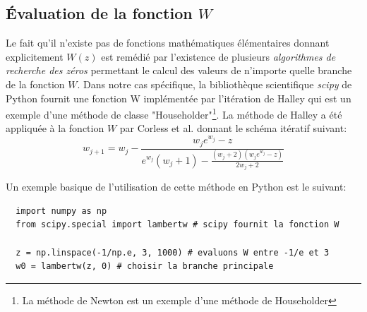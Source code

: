 \subsection{Évaluation de la fonction $W$}

Le fait qu'il n'existe pas de fonctions mathématiques élémentaires donnant explicitement $W(z)$ est remédié par l'existence de plusieurs \textit{algorithmes de recherche des zéros} permettant le calcul des valeurs de n'importe quelle branche de la fonction $W$. Dans notre cas spécifique, la bibliothèque scientifique \textit{scipy} de Python fournit une fonction W implémentée par l'itération de Halley qui est un exemple d'une méthode de classe "Householder"\footnote{La méthode de Newton est un exemple d'une méthode de Householder}. La méthode de Halley a été appliquée à la fonction $W$  par Corless et al. \cite{Corless1996} donnant le schéma itératif suivant:
\begin{equation}
  \label{eq:halley}
  w_{j+1} = w_j - \frac{w_j e^{w_j} - z}{e^{w_j}(w_j + 1) - \frac{(w_j + 2)(w_j e^{w_j} - z)}{2w_j + 2}}
\end{equation}

Un exemple basique de l'utilisation de cette méthode en Python est le suivant:\\

\noindent
\begin{minipage}{\linewidth}
\begin{verbatim}
  import numpy as np 
  from scipy.special import lambertw # scipy fournit la fonction W

  z = np.linspace(-1/np.e, 3, 1000) # evaluons W entre -1/e et 3
  w0 = lambertw(z, 0) # choisir la branche principale
\end{verbatim}
\end{minipage}

